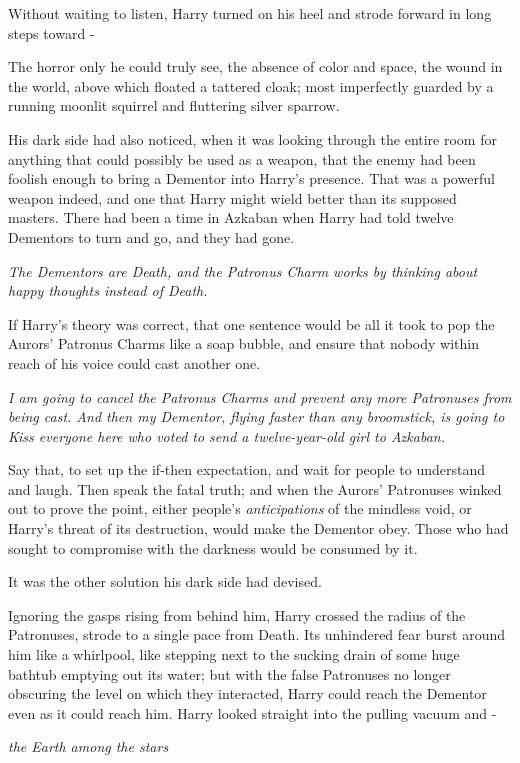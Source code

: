 Without waiting to listen, Harry turned on his heel and strode forward in long steps toward -

The horror only he could truly see, the absence of color and space, the wound in the world, above which floated a tattered cloak; most imperfectly guarded by a running moonlit squirrel and fluttering silver sparrow.

His dark side had also noticed, when it was looking through the entire room for anything that could possibly be used as a weapon, that the enemy had been foolish enough to bring a Dementor into Harry's presence. That was a powerful weapon indeed, and one that Harry might wield better than its supposed masters. There had been a time in Azkaban when Harry had told twelve Dementors to turn and go, and they had gone.

\emph{The Dementors are Death, and the Patronus Charm works by thinking about happy thoughts instead of Death.}

If Harry's theory was correct, that one sentence would be all it took to pop the Aurors' Patronus Charms like a soap bubble, and ensure that nobody within reach of his voice could cast another one.

\emph{I am going to cancel the Patronus Charms and prevent any more Patronuses from being cast. And then my Dementor, flying faster than any broomstick, is going to Kiss everyone here who voted to send a twelve-year-old girl to Azkaban.}

Say that, to set up the if-then expectation, and wait for people to understand and laugh. Then speak the fatal truth; and when the Aurors' Patronuses winked out to prove the point, either people's \emph{anticipations} of the mindless void, or Harry's threat of its destruction, would make the Dementor obey. Those who had sought to compromise with the darkness would be consumed by it.

It was the other solution his dark side had devised.

Ignoring the gasps rising from behind him, Harry crossed the radius of the Patronuses, strode to a single pace from Death. Its unhindered fear burst around him like a whirlpool, like stepping next to the sucking drain of some huge bathtub emptying out its water; but with the false Patronuses no longer obscuring the level on which they interacted, Harry could reach the Dementor even as it could reach him. Harry looked straight into the pulling vacuum and -

\emph{the Earth among the stars}

